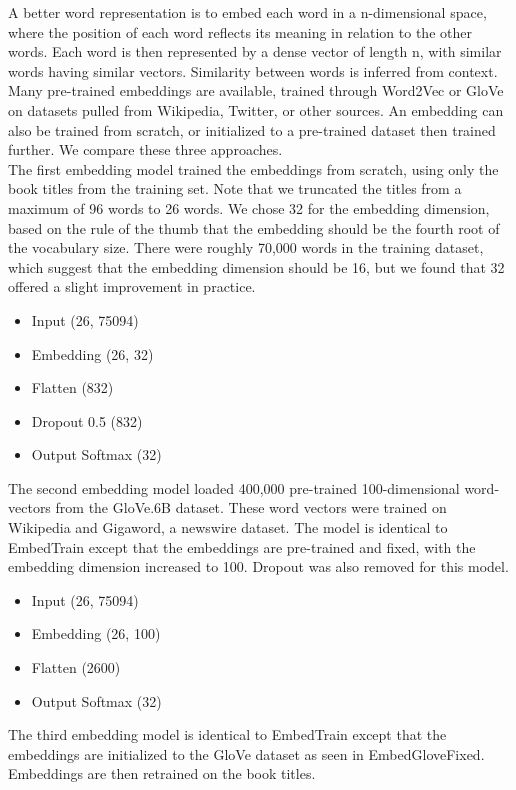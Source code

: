 \documentclass[jou,apacite, 10px]{apa6}
\begin{document}
A better word representation is to embed each word in a n-dimensional space, where the position of each word reflects its meaning in relation to the other words. Each word is then represented by a dense vector of length n, with similar words having similar vectors. Similarity between words is inferred from context. Many pre-trained embeddings are available, trained through Word2Vec or GloVe on datasets pulled from Wikipedia, Twitter, or other sources. An embedding can also be trained from scratch, or initialized to a pre-trained dataset then trained further. We compare these three approaches.\\

The first embedding model trained the embeddings from scratch, using only the book titles from the training set. Note that we truncated the titles from a maximum of 96 words to 26 words. We chose 32 for the embedding dimension, based on the rule of the thumb that the embedding should be the fourth root of the vocabulary size. There were roughly 70,000 words in the training dataset, which suggest that the embedding dimension should be 16, but we found that 32 offered a slight improvement in practice.
\begin{itemize}
    \item Input (26, 75094)
    \item Embedding (26, 32)
    \item Flatten (832)
    \item Dropout 0.5 (832)
    \item Output Softmax (32)
\end{itemize}

The second embedding model loaded 400,000 pre-trained 100-dimensional word-vectors from the GloVe.6B dataset. These word vectors were trained on Wikipedia and Gigaword, a newswire dataset. The model is identical to EmbedTrain except that the embeddings are pre-trained and fixed, with the embedding dimension increased to 100. Dropout was also removed for this model.\\
\begin{itemize}
    \item Input (26, 75094)
    \item Embedding (26, 100)
    \item Flatten (2600)
    \item Output Softmax (32)
\end{itemize}

The third embedding model is identical to EmbedTrain except that the embeddings are initialized to the GloVe dataset as seen in EmbedGloveFixed. Embeddings are then retrained on the book titles.\\
\end{document}
